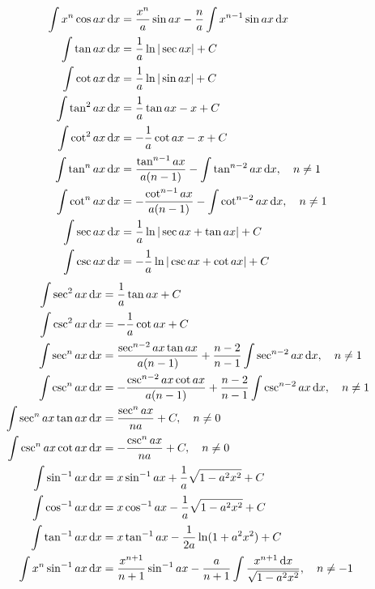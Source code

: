 \begin{align}
  \int x^n \cos ax \dif x &= \frac{x^n}{a} \sin ax - \frac{n}{a} \int x^{n-1} \sin ax \dif x \\
\int \tan ax \dif x &= \frac{1}{a} \ln | \sec ax | + C \\
 \int \cot ax \dif x &= \frac{1}{a} \ln | \sin ax | + C \\
 \int \tan^2 ax \dif x &= \frac{1}{a} \tan ax - x + C \\
 \int \cot^2 ax \dif x &= -\frac{1}{a} \cot ax - x + C \\
 \int \tan^{n} ax \dif x &= \frac{\tan^{n-1} ax}{a(n-1)} - \int \tan^{n-2} ax \dif x , \quad n \neq 1 \\
 \int \cot^{n} ax \dif x &= -\frac{\cot^{n-1} ax}{a(n-1)} - \int \cot^{n-2} ax \dif x , \quad n \neq 1 \\
 \int \sec ax \dif x &= \frac{1}{a} \ln | \sec ax + \tan ax | + C \\
 \int \csc ax \dif x &= - \frac{1}{a} \ln | \csc ax + \cot ax | + C
 \end{align}
\begin{align}
  \int \sec^2 ax \dif x &= \frac{1}{a} \tan ax + C \\
 \int \csc^2 ax \dif x &= -\frac{1}{a} \cot ax + C \\
 \int \sec^n ax \dif x &= \frac{\sec^{n-2} ax \tan ax}{a(n-1)} + \frac{n-2}{n-1} \int \sec^{n-2} ax \dif x, \quad n \neq 1 \\
 \int \csc^n ax \dif x &= - \frac{\csc^{n-2} ax \cot ax}{a(n-1)} + \frac{n-2}{n-1} \int \csc^{n-2} ax \dif x, \quad n \neq 1 \\
 \int \sec^n ax \tan ax \dif x &= \frac{\sec^n ax}{na} + C, \quad n \neq 0 \\
 \int \csc^n ax \cot ax \dif x &= - \frac{\csc^n ax}{na} + C, \quad n \neq 0 \\
 \int \sin^{-1}  ax \dif x &= x \sin^{-1} ax + \frac{1}{a} \sqrt{1-a^2x^2} + C \\
 \int \cos^{-1}  ax \dif x &= x \cos^{-1} ax - \frac{1}{a} \sqrt{1-a^2x^2} + C \\
 \int \tan^{-1} ax \dif x &= x \tan^{-1} ax - \frac{1}{2a} \ln (1+a^2 x^2) + C \\
 \int x^n \sin^{-1} ax \dif x &= \frac{x^{n+1}}{n+1} \sin^{-1} ax - \frac{a}{n+1} \int \frac{x^{n+1} \dif x}{\sqrt{1-a^2x^2}}, \quad n \neq -1\label{مساوات_جدول_تکمل_ننانوے}
 \end{align}
